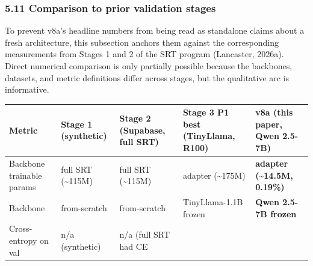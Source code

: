 \documentclass[
  11pt]{article}
\newcounter{none} %
\begin{document}
\subsubsection{5.11 Comparison to prior validation
stages}\label{comparison-to-prior-validation-stages}

To prevent v8a's headline numbers from being read as standalone claims
about a fresh architecture, this subsection anchors them against the
corresponding measurements from Stages 1 and 2 of the SRT program
(Lancaster, 2026a). Direct numerical comparison is only partially
possible because the backbones, datasets, and metric definitions differ
across stages, but the qualitative arc is informative.

{\def\LTcaptype{none} %
\begin{longtable}[]{@{}
  >{\raggedright\arraybackslash}p{}
  >{\raggedright\arraybackslash}p{}
  >{\raggedright\arraybackslash}p{}
  >{\raggedright\arraybackslash}p{}
  >{\raggedright\arraybackslash}p{}@{}}
\toprule\noalign{}
\begin{minipage}[b]{\linewidth}\raggedright
Metric
\end{minipage} & \begin{minipage}[b]{\linewidth}\raggedright
Stage 1 (synthetic)
\end{minipage} & \begin{minipage}[b]{\linewidth}\raggedright
Stage 2 (Supabase, full SRT)
\end{minipage} & \begin{minipage}[b]{\linewidth}\raggedright
Stage 3 P1 best (TinyLlama, R100)
\end{minipage} & \begin{minipage}[b]{\linewidth}\raggedright
\textbf{v8a (this paper, Qwen 2.5-7B)}
\end{minipage} \\
\midrule\noalign{}
\endhead
\bottomrule\noalign{}
\endlastfoot
Backbone trainable params & full SRT (\textasciitilde115M) & full SRT
(\textasciitilde115M) & adapter (\textasciitilde175M) & \textbf{adapter
(\textasciitilde14.5M, 0.19\%)} \\
Backbone & from-scratch & from-scratch & TinyLlama-1.1B frozen &
\textbf{Qwen 2.5-7B frozen} \\
Cross-entropy on val & n/a (synthetic) & n/a (full SRT had CE

\end{longtable}}
\end{document}
